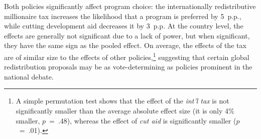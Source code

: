\documentclass[12pt,english]{article}
\begin{document}
Both policies significantly affect program choice: the internationally redistributive millionaire tax increases the likelihood that a program is preferred by 5~p.p., while cutting development aid decreases it by 3~p.p. At the country level, the effects are generally not significant due to a lack of power, but when significant, they have the same sign as the pooled effect. %
On average, the effects of the tax are of similar size to the effects of other policies,\footnote{%
A simple permutation test shows that the effect of the \textit{int'l tax} is not significantly smaller than the average absolute effect size (it is only 4\% smaller, $p$~=~.48), whereas the effect of \textit{cut aid} is significantly smaller ($p$~=~.01).
} %
suggesting that certain global redistribution proposals may be as vote-determining as policies prominent in the national debate. %
\end{document}
